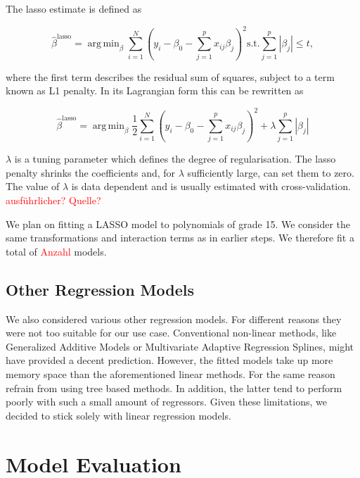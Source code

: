 \documentclass[12pt,a4paper]{article}
\DeclareMathOperator*{\argmin}{arg\,min}
\begin{document}
The lasso estimate is defined as

\begin{equation}
    \hat{\beta}^{\text{lasso}} = \argmin_{\beta} \sum^N_{i=1} \left( y_i - \beta_0 - \sum^p_{j=1} x_{ij} \beta_j \right)^2
    \text{s.t.} \sum^p_{j=1} |\beta_j | \leq t, 
\label{eq:7}
\end{equation}

where the first term describes the residual sum of squares, subject to a
term known as L1 penalty. In its Lagrangian form this can be rewritten
as

\begin{equation}
    \hat{\beta}^{\text{lasso}} = \argmin_{\beta} \frac{1}{2} \sum^N_{i=1} \left( y_i - \beta_0 - \sum^p_{j=1} x_{ij} \beta_j \right)^2 + 
    \lambda \sum^p_{j=1} |\beta_j |
\label{eq:8}
\end{equation}

\(\lambda\) is a tuning parameter which defines the degree of
regularisation. The lasso penalty shrinks the coefficients and, for
\(\lambda\) sufficiently large, can set them to zero. The value of
\(\lambda\) is data dependent and is usually estimated with
cross-validation. \textcolor{red}{ausführlicher? Quelle?}

We plan on fitting a LASSO model to polynomials of grade 15. We consider
the same transformations and interaction terms as in earlier steps. We
therefore fit a total of \textcolor{red}{Anzahl} models.

\hypertarget{other-regression-models}{%
\subsection{Other Regression Models}\label{other-regression-models}}

We also considered various other regression models. For different
reasons they were not too suitable for our use case. Conventional
non-linear methods, like Generalized Additive Models or Multivariate
Adaptive Regression Splines, might have provided a decent prediction.
However, the fitted models take up more memory space than the
aforementioned linear methods. For the same reason refrain from using
tree based methods. In addition, the latter tend to perform poorly with
such a small amount of regressors. Given these limitations, we decided
to stick solely with linear regression models.

\hypertarget{model-evaluation}{%
\section{Model Evaluation}\label{model-evaluation}}
\end{document}
